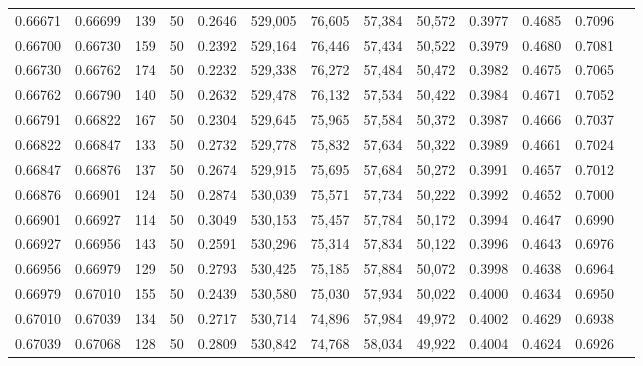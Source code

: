 \begin{tabular}{rrrrrrrrrrrrr}
0.66671 & 0.66699 &   139 &  50 &                                     0.2646 & 529,005 &  76,605 &  57,384 &  50,572 & 0.3977 & 0.4685 & 0.7096 \\
0.66700 & 0.66730 &   159 &  50 &                                     0.2392 & 529,164 &  76,446 &  57,434 &  50,522 & 0.3979 & 0.4680 & 0.7081 \\
0.66730 & 0.66762 &   174 &  50 &                                     0.2232 & 529,338 &  76,272 &  57,484 &  50,472 & 0.3982 & 0.4675 & 0.7065 \\
0.66762 & 0.66790 &   140 &  50 &                                     0.2632 & 529,478 &  76,132 &  57,534 &  50,422 & 0.3984 & 0.4671 & 0.7052 \\
0.66791 & 0.66822 &   167 &  50 &                                     0.2304 & 529,645 &  75,965 &  57,584 &  50,372 & 0.3987 & 0.4666 & 0.7037 \\
0.66822 & 0.66847 &   133 &  50 &                                     0.2732 & 529,778 &  75,832 &  57,634 &  50,322 & 0.3989 & 0.4661 & 0.7024 \\
0.66847 & 0.66876 &   137 &  50 &                                     0.2674 & 529,915 &  75,695 &  57,684 &  50,272 & 0.3991 & 0.4657 & 0.7012 \\
0.66876 & 0.66901 &   124 &  50 &                                     0.2874 & 530,039 &  75,571 &  57,734 &  50,222 & 0.3992 & 0.4652 & 0.7000 \\
0.66901 & 0.66927 &   114 &  50 &                                     0.3049 & 530,153 &  75,457 &  57,784 &  50,172 & 0.3994 & 0.4647 & 0.6990 \\
0.66927 & 0.66956 &   143 &  50 &                                     0.2591 & 530,296 &  75,314 &  57,834 &  50,122 & 0.3996 & 0.4643 & 0.6976 \\
0.66956 & 0.66979 &   129 &  50 &                                     0.2793 & 530,425 &  75,185 &  57,884 &  50,072 & 0.3998 & 0.4638 & 0.6964 \\
0.66979 & 0.67010 &   155 &  50 &                                     0.2439 & 530,580 &  75,030 &  57,934 &  50,022 & 0.4000 & 0.4634 & 0.6950 \\
0.67010 & 0.67039 &   134 &  50 &                                     0.2717 & 530,714 &  74,896 &  57,984 &  49,972 & 0.4002 & 0.4629 & 0.6938 \\
0.67039 & 0.67068 &   128 &  50 &                                     0.2809 & 530,842 &  74,768 &  58,034 &  49,922 & 0.4004 & 0.4624 & 0.6926 \\

\end{tabular}
